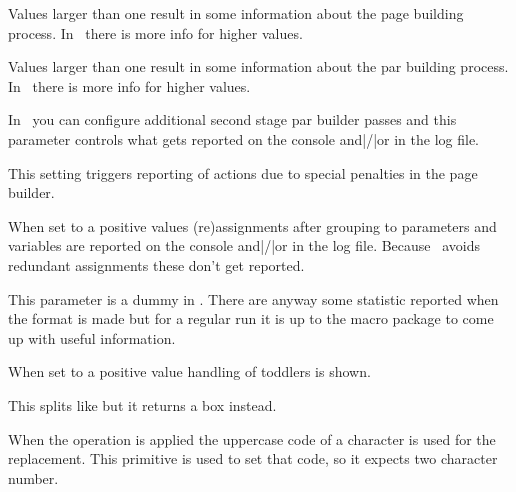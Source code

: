 Values larger than one result in some information about the page building
process. In \LUAMETATEX\ there is more info for higher values.

\stopoldprimitive

\startoldprimitive[title={\prm {tracingparagraphs}}]

Values larger than one result in some information about the par building process.
In \LUAMETATEX\ there is more info for higher values.

\stopoldprimitive

\startnewprimitive[title={\prm {tracingpasses}}]

In \LUAMETATEX\ you can configure additional second stage par builder passes and
this parameter controls what gets reported on the console and|/|or in the log
file.

\stopnewprimitive

\startnewprimitive[title={\prm {tracingpenalties}}]

This setting triggers reporting of actions due to special penalties in the
page builder.

\stopnewprimitive

\startoldprimitive[title={\prm {tracingrestores}}]

When set to a positive values (re)assignments after grouping to parameters and
variables are reported on the console and|/|or in the log file. Because
\LUAMETATEX\ avoids redundant assignments these don't get reported.

\stopoldprimitive

\startoldprimitive[title={\prm {tracingstats}}]

This parameter is a dummy in \LUAMETATEX. There are anyway some statistic
reported when the format is made but for a regular run it is up to the macro
package to come up with useful information.

\stopoldprimitive

\startnewprimitive[title={\prm {tracingtoddlers}}]

When set to a positive value handling of toddlers is shown.

\stopnewprimitive

\startnewprimitive[title={\prm {tsplit}}]

This splits like  but it returns a  box instead.

\stopnewprimitive

\startoldprimitive[title={\prm {uccode}}]

When the  operation is applied the uppercase code of a character
is used for the replacement. This primitive is used to set that code, so it
expects two character number.

